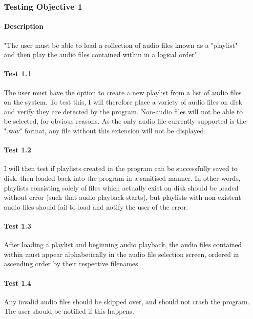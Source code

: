 \pagebreak
\subsubsection{Testing Objective 1}
\paragraph{Description} "The user must be able to load a collection of audio files known as a "playlist" and then play the audio files contained within in a logical order"

\paragraph{Test 1.1}
The user must have the option to create a new playlist from a list of audio files on the system.  To test this, I will therefore place a variety of audio files on disk and verify they are detected by the program. Non-audio files will not be able to be selected, for obvious reasons. As the only audio file currently supported is the ".wav" format, any file without this extension will not be displayed.

\paragraph{Test 1.2}
I will then test if playlists created in the program can be successfully saved to disk, then loaded back into the program in a sanitised manner. In other words, playlists consisting solely of files which actually exist on disk should be loaded without error (such that audio playback starts), but playlists with non-existent audio files should fail to load and notify the user of the error.

\paragraph{Test 1.3}
After loading a playlist and beginning audio playback, the audio files contained within must appear alphabetically in the audio file selection screen, ordered in ascending order by their respective filenames.

\paragraph{Test 1.4}
Any invalid audio files should be skipped over, and should not crash the program. The user should be notified if this happens.

\pagebreak
